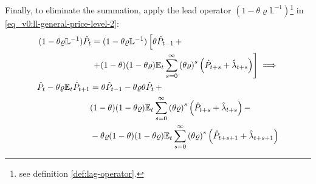 \documentclass[../thesis.tex]{subfiles}
\begin{document}
	Finally, to eliminate the summation, apply the lead operator $(1- \theta \varrho \mathbb{L}^{-1})$\footnote{see definition \ref{def:lag-operator}.} in \ref{eq_v0:ll-general-price-level-2}:
	\begin{align}
		\begin{split}
			(1- \theta \varrho \mathbb{L}^{-1}) \hat{P}_t &= (1- \theta \varrho \mathbb{L}^{-1}) \left[ \theta \hat{P}_{t-1} \, + \right. \\
			&\left. + (1-\theta) (1- \theta \varrho) {\mathbb{E}_{t}} \sum_{s=0}^{\infty} \left( \theta \varrho \right)^s \left( \hat{P}_{t+s} + \hat{\lambda}_{t+s} \right) \right] \implies \nonumber
		\end{split} \\
		\begin{split}
			\hat{P}_t - \theta \varrho {\mathbb{E}_{t}} \hat{P}_{t+1} &= \theta \hat{P}_{t-1} - \theta \varrho \theta \hat{P}_t \, + \\
			& (1-\theta) (1- \theta \varrho) {\mathbb{E}_{t}} \sum_{s=0}^{\infty} \left( \theta \varrho \right)^s \left( \hat{P}_{t+s} + \hat{\lambda}_{t+s} \right) - \\
			& - \theta \varrho (1-\theta) (1- \theta \varrho) {\mathbb{E}_{t}} \sum_{s=0}^{\infty} \left( \theta \varrho \right)^s \left( \hat{P}_{t+s+1} + \hat{\lambda}_{t+s+1} \right)
		\end{split} \label{eq_v0:ll-general-price-level-3}
	\end{align}
	
\end{document}
